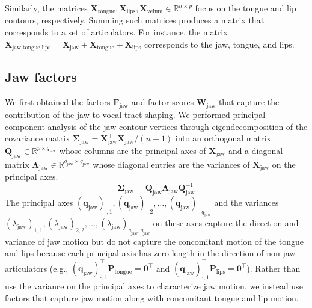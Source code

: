 \documentclass[preprint]{JASAnew}
\begin{document}
%
Similarly, the matrices $\mathbf{X}_\text{tongue},\mathbf{X}_\text{lips},\mathbf{X}_\text{velum} \in \mathbb{R}^{n\times p}$ focus on the tongue and lip contours, respectively. 
% 
Summing such matrices produces a matrix that corresponds to a set of articulators. For instance, the matrix $\mathbf{X}_{\text{jaw,tongue,lips}} = \mathbf{X}_\text{jaw} + \mathbf{X}_\text{tongue} + \mathbf{X}_\text{lips}$ corresponds to the jaw, tongue, and lips.





\subsection{Jaw factors}
\label{subsec:jawfactors}

We first obtained the factors $\mathbf{F}_\text{jaw}$ and factor scores $\mathbf{W}_\text{jaw}$ that capture the contribution of the jaw to vocal tract shaping. 
% 
We performed principal component analysis of the jaw contour vertices through eigendecomposition of the covariance matrix $\boldsymbol{\Sigma}_\text{jaw} = \mathbf{X}_\text{jaw}^\intercal \mathbf{X}_\text{jaw}/(n-1)$ into an orthogonal matrix $\mathbf{Q}_\text{jaw} \in \mathbb{R}^{p\times q_\text{jaw}}$ whose columns are the principal axes of $\mathbf{X}_\text{jaw}$ and a diagonal matrix $\boldsymbol{\Lambda}_\text{jaw} \in \mathbb{R}^{q_\text{jaw} \times q_\text{jaw}}$ whose diagonal entries are the variances of $\mathbf{X}_\text{jaw}$ on the principal axes.
% 
\begin{equation}
\boldsymbol{\Sigma}_\text{jaw} = \mathbf{Q}_\text{jaw}\boldsymbol{\Lambda}_\text{jaw} \mathbf{Q}_\text{jaw}^{-1}
\end{equation}
%
The principal axes $(\mathbf{q}_\text{jaw})_{\cdot,1}, (\mathbf{q}_\text{jaw})_{\cdot,2}, \ldots, (\mathbf{q}_\text{jaw})_{\cdot,q_\text{jaw}}$ and the variances $(\lambda_\text{jaw})_{1,1}, (\lambda_\text{jaw})_{2,2}, \ldots, (\lambda_\text{jaw})_{q_\text{jaw},q_\text{jaw}}$ on these axes capture the direction and variance of jaw motion but do not capture the concomitant motion of the tongue and lips 
% 
because each principal axis has zero length in the direction of non-jaw articulators 
% 
(e.g., $(\mathbf{q}_\text{jaw})_{\cdot,1}^\intercal \mathbf{P}_\text{tongue} = \mathbf{0}^\intercal$ and $(\mathbf{q}_\text{jaw})_{\cdot,1}^\intercal \mathbf{P}_\text{lips} = \mathbf{0}^\intercal$). 
% 
Rather than use the variance on the principal axes to characterize jaw motion, we instead use factors that capture jaw motion along with concomitant tongue and lip motion. 
\end{document}
